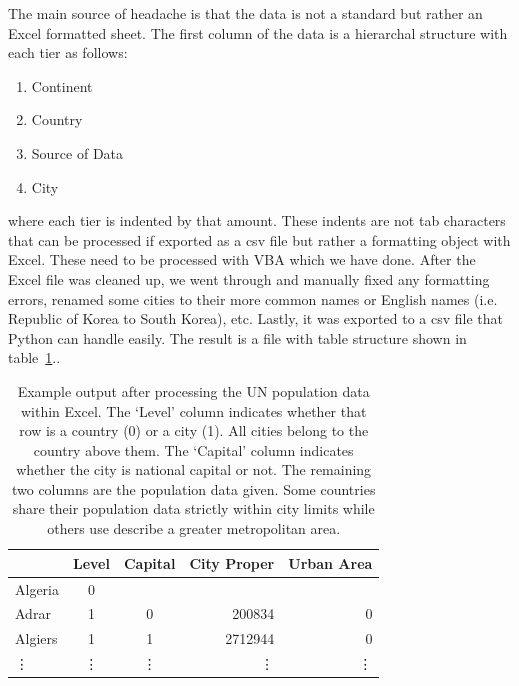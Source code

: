 \documentclass[
 reprint,
 amsmath,amssymb,
 aps,
prb,
floatfix
]{revtex4-2}
\begin{document}
    The main source of headache is that the data is not a standard but rather an Excel formatted sheet. The first column of the data is a hierarchal structure with each tier as follows:
    \begin{enumerate}[topsep=0pt,itemsep=-1ex,partopsep=1ex,parsep=1ex]
        \item Continent
        \item Country
        \item Source of Data
        \item City
    \end{enumerate}
    where each tier is indented by that amount. These indents are not tab characters that can be processed if exported as a csv file but rather a formatting object with Excel. These need to be processed with VBA which we have done. After the Excel file was cleaned up, we went through and manually fixed any formatting errors, renamed some cities to their more common names or English names (i.e. Republic of Korea to South Korea), etc. Lastly, it was exported to a csv file that Python can handle easily. The result is a file with table structure shown in table~\ref{table_unpop}..
    \begin{table}[htb]
        \centering
        \begin{tabular}{l|cc|rr}
                & Level & Capital & City Proper & Urban Area \\
                \hline\hline
        Algeria   & 0     &         &             &                      \\
        Adrar     & 1     & 0       & 200834      & 0                    \\
        Algiers  & 1      & 1        & 2712944    & 0                      \\
                \vdots & \vdots & \vdots & \vdots & \vdots
        \end{tabular}
        \caption{Example output after processing the UN population data within Excel. The `Level' column indicates whether that row is a country (0) or a city (1). All cities belong to the country above them. The `Capital' column indicates whether the city is national capital or not. The remaining two columns are the population data given. Some countries share their population data strictly within city limits while others use describe a greater metropolitan area.}
        \label{table_unpop}
    \end{table}
\end{document}

